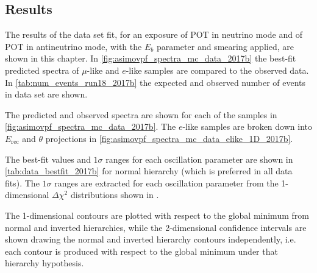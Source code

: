 \subsection{Results}

The results of the \RunPeriod data set fit, for an exposure of \TotalPotNuRunOneEight POT in neutrino mode and of \TotalPotNuBarRunOneEight POT in antineutrino mode, with the $E_b$ parameter and smearing applied, are shown in this chapter.  In \cref{fig:asimovpf_spectra_mc_data_2017b} the best-fit predicted spectra of $\mu$-like and $e$-like samples are compared to the observed data. In \cref{tab:num_events_run18_2017b} the expected and observed number of events in \RunPeriod data set are shown.

\begin{table}[htb]
\centering

\caption{
The observed and best-fit expected number of events in \RunPeriod data set for an exposure of \TotalPotNuRunOneEight POT in neutrino mode and of \TotalPotNuBarRunOneEight POT in antineutrino mode are shown 
for each selected sample. The prediction is produced using the BANFF tuning.
}
\label{tab:num_events_run18_2017b}
\end{table}

The predicted and observed spectra are shown for each of the samples in \cref{fig:asimovpf_spectra_mc_data_2017b}. The $e$-like samples are broken down into $E_\text{rec}$ and $\theta$ projections in \cref{fig:asimovpf_spectra_mc_data_elike_1D_2017b}.



The best-fit values and $1\sigma$ ranges for each oscillation parameter are shown in \cref{tab:data_bestfit_2017b} for normal hierarchy (which is preferred in all data fits). The $1\sigma$ ranges are extracted for each oscillation parameter from the 1-dimensional $\Delta \chi^2$ distributions shown in .

The 1-dimensional contours are plotted with respect to the global minimum from normal and inverted hierarchies, while the 2-dimensional confidence intervals are shown drawing the normal and inverted hierarchy contours independently, i.e. each contour is produced with respect to the global minimum under that hierarchy hypothesis.

\begin{table}
\centering

\caption{
The \RunPeriod measured oscillation parameter best-fit and the $\pm 1\sigma$ intervals are shown for normal and inverted hierarchies with respect to the hierarchy best-fit. The $\pm 1\sigma$ interval is obtained by using the constant $\Delta \chi^2$ method. For each parameter normal hierarchy is the global best-fit.
}
\label{tab:data_bestfit_2017b}
\end{table}

